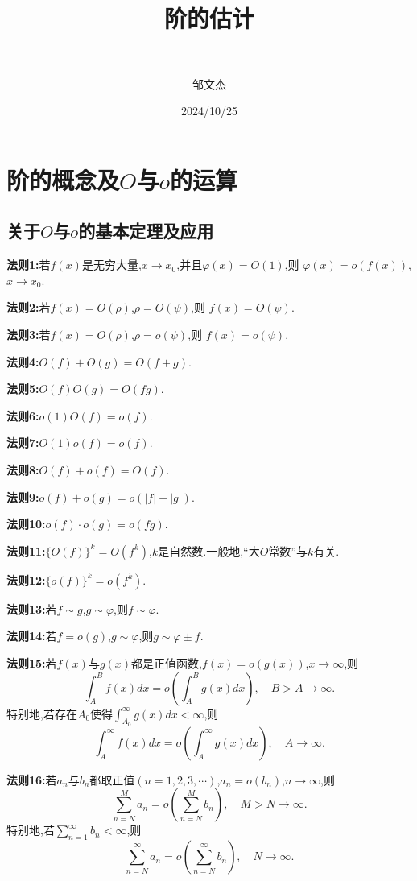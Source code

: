 \documentclass[lang=cn,newtx,10pt,scheme=chinese]{../Template/elegantbook}
\title{阶的估计}
\subtitle{\,\,}
\author{邹文杰}
\institute{无}
\date{2024/10/25}
\begin{document}
\maketitle
\frontmatter

\tableofcontents

\mainmatter%

\chapter{阶的概念及$O$与$o$的运算}

\section{关于$O$与$o$的基本定理及应用}

\begin{theorem}[$O$与$o$的基本运算法则]\label{$O$与$o$的基本运算法则}
    \textbf{法则1:}若\(f(x)\)是无穷大量,\(x\to x_0\),并且\(\varphi(x)=O(1)\),则
\(\varphi(x)=o(f(x))\),\(x\to x_0\).

\textbf{法则2:}若\(f(x)=O(\rho)\),\(\rho = O(\psi)\),则
\(f(x)=O(\psi)\).

\textbf{法则3:}若\(f(x)=O(\rho)\),\(\rho = o(\psi)\),则
\(f(x)=o(\psi)\).

\textbf{法则4:}\(O(f)+O(g)=O(f + g)\).

\textbf{法则5:}\(O(f)O(g)=O(fg)\).

\textbf{法则6:}\(o(1)O(f)=o(f)\).

\textbf{法则7:}\(O(1)o(f)=o(f)\).

\textbf{法则8:}\(O(f)+o(f)=O(f)\).

\textbf{法则9:}\(o(f)+o(g)=o(|f|+|g|)\).

\textbf{法则10:}\(o(f)\cdot o(g)=o(fg)\).

\textbf{法则11:}\(\{O(f)\}^k = O(f^k)\),\(k\)是自然数.一般地,“大\(O\)常数”与\(k\)有关.

\textbf{法则12:}\(\{o(f)\}^k = o(f^k)\).

\textbf{法则13:}若\(f\sim g\),\(g\sim\varphi\),则\(f\sim\varphi\).

\textbf{法则14:}若\(f = o(g)\),\(g\sim\varphi\),则\(g\sim\varphi\pm f\).

\textbf{法则15:}若\(f(x)\)与\(g(x)\)都是正值函数,\(f(x)=o(g(x))\),\(x\to\infty\),则
\[
\int_{A}^{B}f(x)dx = o\left(\int_{A}^{B}g(x)dx\right),\quad B > A\to\infty.
\]
特别地,若存在\(A_0\)使得\(\int_{A_0}^{\infty}g(x)dx<\infty\),则
\[
\int_{A}^{\infty}f(x)dx = o\left(\int_{A}^{\infty}g(x)dx\right),\quad A\to\infty.
\]

\textbf{法则16:}若\(a_n\)与\(b_n\)都取正值\((n = 1,2,3,\cdots)\),\(a_n=o(b_n)\),\(n\to\infty\),则
\[
\sum_{n = N}^{M}a_n = o\left(\sum_{n = N}^{M}b_n\right),\quad M > N\to\infty.
\]
特别地,若\(\sum_{n = 1}^{\infty}b_n<\infty\),则
\[
\sum_{n = N}^{\infty}a_n = o\left(\sum_{n = N}^{\infty}b_n\right),\quad N\to\infty.
\]
\end{theorem}
\end{document}
